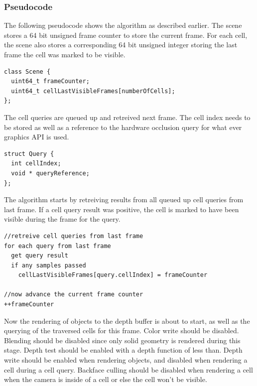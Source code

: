 \documentclass[12pt]{ucthesis}
\begin{document}
\subsubsection{Pseudocode}
\label{pseudo-code-1}

The following pseudocode shows the algorithm as described earlier.
The scene stores a 64 bit unsigned frame counter to store the current frame.
For each cell, the scene also stores a corresponding 64 bit unsigned integer storing the last frame the cell was marked to be visible.

\begin{lstlisting}
class Scene {
  uint64_t frameCounter;
  uint64_t cellLastVisibleFrames[numberOfCells];
};
\end{lstlisting}

The cell queries are queued up and retreived next frame.
The cell index needs to be stored as well as a reference to the hardware occlusion query for what ever graphics API is used.

\begin{lstlisting}
struct Query {
  int cellIndex;
  void * queryReference;
};
\end{lstlisting}

The algorithm starts by retreiving results from all queued up cell queries from last frame.
If a cell query result was positive, the cell is marked to have been visible during the frame for the query.

\begin{lstlisting}
//retreive cell queries from last frame
for each query from last frame
  get query result
  if any samples passed
    cellLastVisibleFrames[query.cellIndex] = frameCounter

//now advance the current frame counter
++frameCounter
\end{lstlisting}

Now the rendering of objects to the depth buffer is about to start, as well as the querying of the traversed cells for this frame.
Color write should be disabled.
Blending should be disabled since only solid geometry is rendered during this stage.
Depth test should be enabled with a depth function of less than.
Depth write should be enabled when rendering objects, and disabled when rendering a cell during a cell query.
Backface culling should be disabled when rendering a cell when the camera is inside of a cell or else the cell won't be visible.
\end{document}
